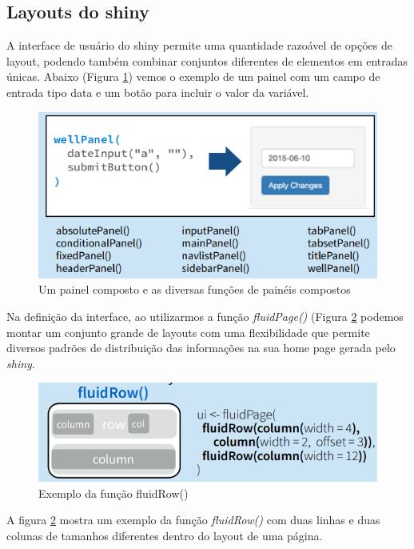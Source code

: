 \documentclass[12pt,a4paper,oneside]{erdc}
\begin{document}
\subsection{Layouts do shiny}

A interface de usuário do shiny permite uma quantidade razoável de opções de layout, podendo também combinar conjuntos diferentes de elementos em entradas únicas. Abaixo (Figura \ref{fig:bpcursoteccomp002019f06-13}) vemos o exemplo de um painel com um campo de entrada tipo data e um botão para incluir o valor da variável.

\begin{figure}[htpb]
	\centering
	\includegraphics[width=0.7\linewidth]{../figs/BP_Curso_TecComp_00_2019_f06-13}
	\caption{Um painel composto e as diversas funções de painéis compostos}
	\label{fig:bpcursoteccomp002019f06-13}
\end{figure}

Na definição da interface, ao utilizarmos a função \textit{fluidPage()} (Figura \ref{fig:bpcursoteccomp002019f06-14} podemos montar um conjunto grande de layouts com uma flexibilidade que permite diversos padrões de distribuição das informações na sua home page gerada pelo \textit{shiny}. 

\begin{figure}[htpb]
	\centering
	\includegraphics[width=0.7\linewidth]{../figs/BP_Curso_TecComp_00_2019_f06-14}
	\caption{Exemplo da função fluidRow()}
	\label{fig:bpcursoteccomp002019f06-14}
\end{figure}

A figura \ref{fig:bpcursoteccomp002019f06-14} mostra um exemplo da função \textit{fluidRow()} com duas linhas e duas colunas de tamanhos diferentes dentro do layout de uma página.
\end{document}
